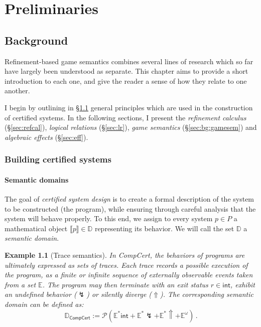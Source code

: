 \documentclass[11pt,oneside,draft]{book}
\newtheorem{example}[theorem]{Example}
\theoremstyle{definition}
\newcommand{\kw}[1]{\ensuremath{ \mathsf{#1} }}
\begin{document}



\part{Preliminaries} \label{part:prelim}

\chapter{Background} %

Refinement-based game semantics combines
several lines of research
which so far have largely been understood as separate.
This chapter aims to provide a short introduction to each one,
and give the reader a sense of how they relate to one another.

I begin
by outlining in \S\ref{sec:principles} general principles
which are used in the construction of certified systems.
In the following sections,
I present
the \emph{refinement calculus} (\S\ref{sec:refcal}),
\emph{logical relations} (\S\ref{sec:lr}),
\emph{game semantics} (\S\ref{sec:bg:gamesem}) and
\emph{algebraic effects} (\S\ref{sec:eff}).

\section{Building certified systems} \label{sec:principles} %

\subsection{Semantic domains} %

The goal of \emph{certified system design} is
to create a formal description of
the system to be constructed (the program),
while ensuring
through careful analysis
that the system
will behave properly.
To this end,
we assign
to every system $p \in P$
a mathematical object $\llbracket p \rrbracket \in \mathbb{D}$
representing its behavior.
We will call the set $\mathbb{D}$ a \emph{semantic domain}.

\begin{example}[Trace semantics] \label{ex:trsem} %
In CompCert,
the behaviors of programs are ultimately expressed
as sets of traces.
Each trace records a possible execution of the program,
as a finite or infinite sequence of externally observable events
taken from a set $\mathbb{E}$.
The program may then
terminate with an exit status $r \in \kw{int}$,
exhibit an undefined behavior ($\lightning$)
or silently diverge ($\Uparrow$).
The corresponding semantic domain can be defined as:
\[
  \mathbb{D}_\kw{CompCert} :=
    \mathcal{P}
      (\mathbb{E}^*\kw{int} +
       \mathbb{E}^*{\lightning} +
       \mathbb{E}^*{\Uparrow} +
       \mathbb{E}^\omega)
  \,.
\]
\end{example}
\end{document}

